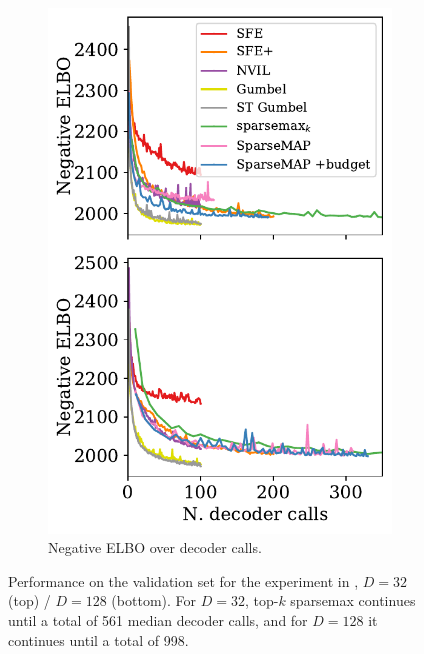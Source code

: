 \begin{figure}[ht]
\begin{subfigure}[b]{0.49\textwidth}
        \includegraphics[width=\textwidth]{Figures/elbo-calls.pdf}
        \caption{Negative ELBO over decoder calls.}
        \label{fig:elbo_bit_calls}
    \end{subfigure}
    \caption{Performance on the validation set
        for the experiment in ,
        $D=32$ (top) / $D=128$ (bottom). For $D=32$, top-$k$ sparsemax continues
        until a total of 561 median decoder calls, and for $D=128$ it continues
        until a total of 998.}
    \label{fig:elbo_bit}
\end{figure}

